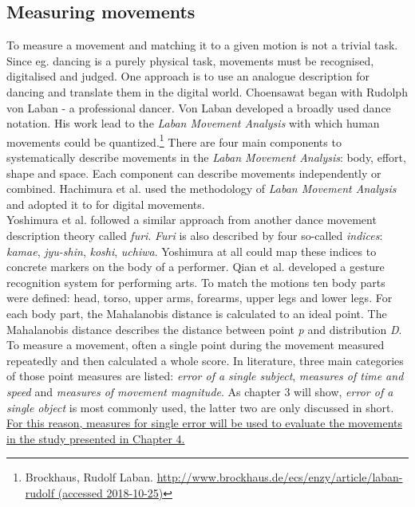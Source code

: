 \subsection{Measuring movements}
To measure a movement and matching it to a given motion is not a trivial task. Since eg. dancing is a purely physical task, movements must be recognised, digitalised and judged. One approach is to use an analogue description for dancing and translate them in the digital world. Choensawat \cite{Choensawat2015} began with Rudolph von Laban - a professional dancer. Von Laban developed a broadly used dance notation. His work lead to the \textit{Laban Movement Analysis} with which human movements could be quantized.\footnote{Brockhaus, Rudolf Laban. \hyperlink{http://www.brockhaus.de/ecs/enzy/article/laban-rudolf}{http://www.brockhaus.de/ecs/enzy/article/laban-rudolf (accessed 2018-10-25)}} There are four main components to systematically describe movements in the \textit{Laban Movement Analysis}: body, effort, shape and space. Each component can describe movements independently or combined. Hachimura et al. \cite{Hachimura2004} used the methodology of \textit{Laban Movement Analysis} and adopted it to for digital movements.\\
Yoshimura et al. \cite{Yoshimura2006} followed a similar approach from another dance movement description theory called \textit{furi}. \textit{Furi} is also described by four so-called \textit{indices}: \textit{kamae}, \textit{jyu-shin}, \textit{koshi}, \textit{uchiwa}. Yoshimura at all could map these indices to concrete markers on the body of a performer. Qian et al. \cite{Qian2005} developed a gesture recognition system for performing arts. To match the motions ten body parts were defined: head, torso, upper arms, forearms, upper legs and lower legs. For each body part, the Mahalanobis distance is calculated to an ideal point. The Mahalanobis distance describes the distance between point \textit{p} and distribution \textit{D}.\\
To measure a movement, often a single point during the movement measured repeatedly and then calculated a whole score. In literature, three main categories of those point measures are listed: \textit{error of a single subject}, \textit{measures of time and speed} and \textit{measures of movement magnitude}. As chapter 3 will show, \textit{error of a single object} is most commonly used, the latter two are only discussed in short. \ul{For this reason, measures for single error will be used to evaluate the movements in the study presented in Chapter 4.}
